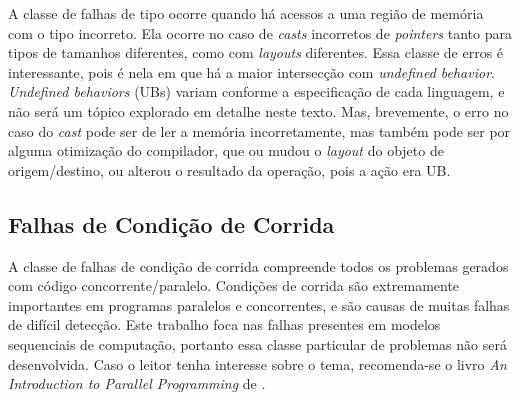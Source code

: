 A classe de falhas de tipo ocorre quando há acessos a uma região de memória com o tipo incorreto. Ela ocorre no caso de \emph{casts} incorretos de \emph{pointers} tanto para tipos de tamanhos diferentes, como com \emph{layouts} diferentes. Essa classe de erros é interessante, pois é nela em que há a maior intersecção com \emph{undefined behavior}. \emph{Undefined behaviors} (UBs) variam conforme a especificação de cada linguagem, e não será um tópico explorado em detalhe neste texto. Mas, brevemente, o erro no caso do \emph{cast} pode ser de ler a memória incorretamente, mas também pode ser por alguma otimização do compilador, que ou mudou o \emph{layout} do objeto de origem/destino, ou alterou o resultado da operação, pois a ação era UB.

\subsection{Falhas de Condição de Corrida}

A classe de falhas de condição de corrida compreende todos os problemas gerados com código concorrente/paralelo. Condições de corrida são extremamente importantes em programas paralelos e concorrentes, e são causas de muitas falhas de difícil detecção. Este trabalho foca nas falhas presentes em modelos sequenciais de computação, portanto essa classe particular de problemas não será desenvolvida. Caso o leitor tenha interesse sobre o tema, recomenda-se o livro \emph{An Introduction to Parallel Programming} de \citet{pacheco2021introduction}.
